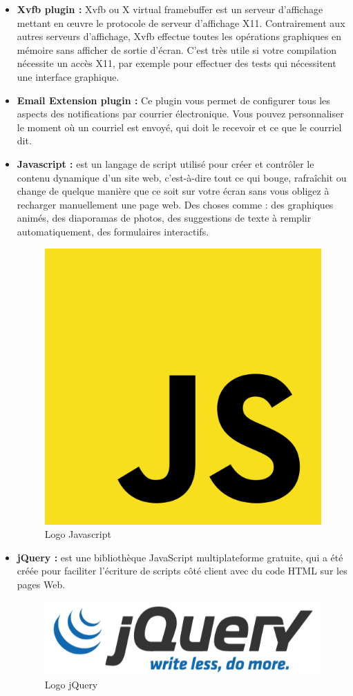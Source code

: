 \begin{itemize}
	\item \textbf{Xvfb plugin\cite{emailextension} :} Xvfb ou X virtual framebuffer est un serveur d'affichage mettant en œuvre le protocole de serveur d'affichage X11. Contrairement aux autres serveurs d'affichage, Xvfb effectue toutes les opérations graphiques en mémoire sans afficher de sortie d'écran. C'est très utile si votre compilation nécessite un accès X11, par exemple pour effectuer des tests qui nécessitent une interface graphique.
	\item \textbf{Email Extension plugin :\cite{emailextension}} Ce plugin vous permet de configurer tous les aspects des notifications par courrier électronique. Vous pouvez personnaliser le moment où un courriel est envoyé, qui doit le recevoir et ce que le courriel dit.
	\item \textbf{Javascript\cite{js} :} est un langage de script utilisé pour créer et contrôler le contenu dynamique d'un site web, c'est-à-dire tout ce qui bouge, rafraîchit ou change de quelque manière que ce soit sur votre écran sans vous obligez à recharger manuellement une page web. Des choses comme : des graphiques animés, des diaporamas de photos, des suggestions de texte à remplir automatiquement, des formulaires interactifs.
	\begin{figure}[H]
		\centering
		\includegraphics[width=0.13\linewidth]{img/logos/js}
		\caption[Logo Javascript]{Logo Javascript}
		\label{fig:js}
	\end{figure}
	
	\item \textbf{jQuery\cite{jquery} :} est une bibliothèque JavaScript multiplateforme gratuite, qui a été créée pour faciliter l'écriture de scripts côté client avec du code HTML sur les pages Web.
	\begin{figure}[H]
		\centering
		\includegraphics[width=0.3\linewidth]{img/logos/jquery}
		\caption[Logo jQuery]{Logo jQuery}
		\label{fig:jquery}
	\end{figure}
	

\end{itemize}
